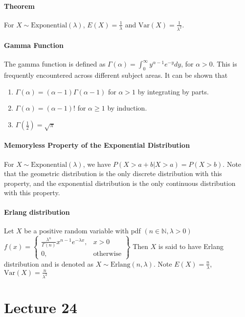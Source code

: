\documentclass[10pt,letter]{article}
\begin{document}
\paragraph{Theorem}
For $X\sim\text{Exponential}(\lambda)$, $E(X)=\frac{1}{\lambda}$ and $\text{Var}(X)=\frac{1}{\lambda^2}$. 

\paragraph{Gamma Function}
The gamma function is defined as $\Gamma(\alpha)=\int_0^\infty y^{\alpha-1}e^{-y}dy$, for $\alpha>0$. This is frequently encountered across different subject areas. It can be shown that \begin{enumerate}
    \item $\Gamma(\alpha)=(\alpha-1)\Gamma(\alpha-1)$ for $\alpha>1$ by integrating by parts.
    \item $\Gamma(\alpha)=(\alpha-1)!$ for $\alpha\geq1$ by induction. 
    \item $\Gamma\left(\frac{1}{2}\right)=\sqrt{\pi}$
\end{enumerate}
\paragraph{Memoryless Property of the Exponential Distribution}
For $X\sim\text{Exponential}(\lambda)$, we have $P(X>a+b|X>a)=P(X>b)$. Note that the geometric distribution is the only discrete distribution with this property, and the exponential distribution is the only continuous distribution with this property.

\paragraph{Erlang distribution}
Let $X$ be a positive random variable with pdf $(n\in\mathbb{N},\lambda>0)$ \\ $f(x)=\left.\begin{cases}\frac{\lambda^n}{\Gamma(n)}x^{n-1}e^{-\lambda x}, & x>0\\ 0, & \text{otherwise}\end{cases}\right\}$ Then $X$ is said to have Erlang distribution and is denoted as $X\sim \text{Erlang}(n,\lambda)$. Note $E(X)=\frac{n}{\lambda}$, $\text{Var}(X)=\frac{n}{\lambda^2}$


\section*{Lecture 24}
\end{document}
